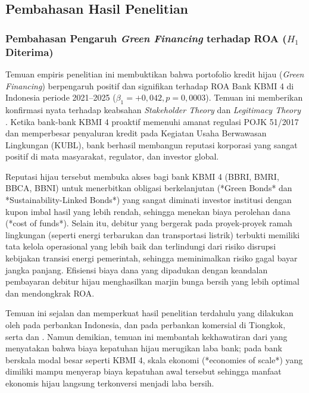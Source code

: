 \documentclass[12pt,a4paper]{article}
\numberwithin{equation}{section}
\begin{document}
\subsection{Pembahasan Hasil Penelitian}

\subsubsection{Pembahasan Pengaruh \texorpdfstring{\emph{Green Financing} terhadap ROA ($H_1$ Diterima)}{Green Financing terhadap ROA (H1 Diterima)}}
\noindent
Temuan empiris penelitian ini membuktikan bahwa portofolio kredit hijau (\emph{Green Financing}) berpengaruh positif dan signifikan terhadap ROA Bank KBMI 4 di Indonesia periode 2021--2025 ($\beta_1 = +0{,}042, p = 0{,}0003$). Temuan ini memberikan konfirmasi nyata terhadap keabsahan \emph{Stakeholder Theory} \citep{Freeman2010} dan \emph{Legitimacy Theory} \citep{Suchman1995}. Ketika bank-bank KBMI 4 proaktif memenuhi amanat regulasi POJK 51/2017 dan memperbesar penyaluran kredit pada Kegiatan Usaha Berwawasan Lingkungan (KUBL), bank berhasil membangun reputasi korporasi yang sangat positif di mata masyarakat, regulator, dan investor global.

\noindent
Reputasi hijau tersebut membuka akses bagi bank KBMI 4 (BBRI, BMRI, BBCA, BBNI) untuk menerbitkan obligasi berkelanjutan (*Green Bonds* dan *Sustainability-Linked Bonds*) yang sangat diminati investor institusi dengan kupon imbal hasil yang lebih rendah, sehingga menekan biaya perolehan dana (*cost of funds*). Selain itu, debitur yang bergerak pada proyek-proyek ramah lingkungan (seperti energi terbarukan dan transportasi listrik) terbukti memiliki tata kelola operasional yang lebih baik dan terlindungi dari risiko disrupsi kebijakan transisi energi pemerintah, sehingga meminimalkan risiko gagal bayar jangka panjang. Efisiensi biaya dana yang dipadukan dengan keandalan pembayaran debitur hijau menghasilkan marjin bunga bersih yang lebih optimal dan mendongkrak ROA.

\noindent
Temuan ini sejalan dan memperkuat hasil penelitian terdahulu yang dilakukan oleh \citet{Pramono2022} pada perbankan Indonesia, \citet{Yin2021} dan \citet{Sun2021} pada perbankan komersial di Tiongkok, serta \citet{SariAstuti2023} dan \citet{WulandariRahardjo2022}. Namun demikian, temuan ini membantah kekhawatiran dari \citet{Akomea2022} yang menyatakan bahwa biaya kepatuhan hijau merugikan laba bank; pada bank berskala modal besar seperti KBMI 4, skala ekonomi (*economies of scale*) yang dimiliki mampu menyerap biaya kepatuhan awal tersebut sehingga manfaat ekonomis hijau langsung terkonversi menjadi laba bersih.
\end{document}
